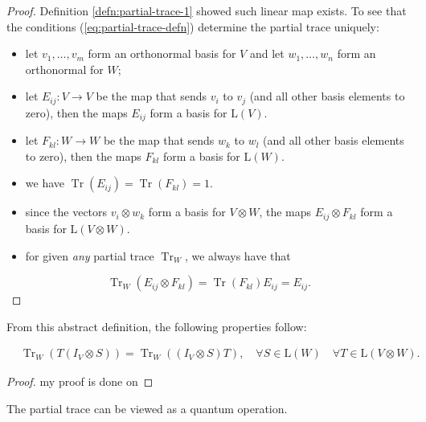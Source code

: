 \begin{proof} %
Definition \ref{defn:partial-trace-1} showed such linear map exists.
To see that the conditions (\ref{eq:partial-trace-defn}) determine the partial trace uniquely:
\begin{itemize}
    \item let $v_1, \ldots, v_m$ form an orthonormal basis for $V$ and let $w_1, \ldots, w_n$ form an orthonormal for $W$;
    \item let $E_{i j}: V \rightarrow V$ be the map that sends $v_i$ to $v_j$ (and all other basis elements to zero), then the maps $E_{i j}$ form a basis for $\mathrm{L}(V)$.
    \item let $F_{k l}: W \rightarrow W$ be the map that sends $w_k$ to $w_l$ (and all other basis elements to zero), then the maps $F_{k l}$ form a basis for $\mathrm{L}(W)$.
    \item we have $\operatorname{Tr}(E_{ij})=\operatorname{Tr}(F_{kl})=1.$
    \item since the vectors $v_i \otimes w_k$ form a basis for $V \otimes W$, the maps $E_{i j} \otimes F_{k l}$ form a basis for $\mathrm{L}(V \otimes W)$.
    \item for given \textit{any} partial trace $\operatorname{Tr}_W$, we always have that
\end{itemize}
\begin{equation}
    \operatorname{Tr}_W(E_{i j} \otimes F_{k l})=\operatorname{Tr}(F_{k l}) E_{i j} = E_{i j}.
\end{equation}
\end{proof}

From this abstract definition, the following properties follow:

\begin{proposition}
\begin{equation}
\begin{aligned}
& \operatorname{Tr}_W\left(T\left(I_V \otimes S\right)\right)=\operatorname{Tr}_W\left(\left(I_V \otimes S\right) T\right) ,\quad \forall S \in \mathrm{L}(W) \quad \forall T \in \mathrm{L}(V \otimes W).
\end{aligned}
\end{equation}
\end{proposition}

\begin{proof}
    my proof is done on
\end{proof}

The partial trace can be viewed as a quantum operation.

